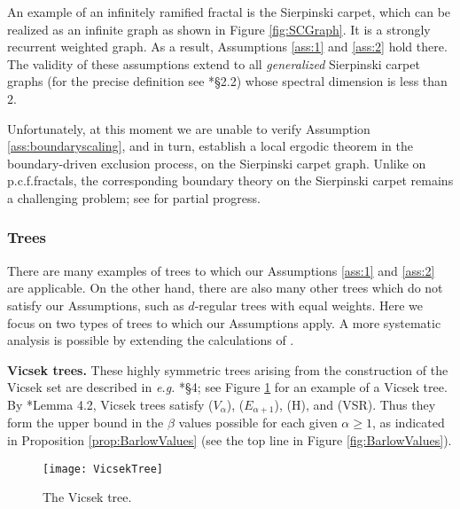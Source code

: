 \documentclass[11pt]{amsart}
\theoremstyle{plain}
\theoremstyle{definition}
\theoremstyle{remark}
\begin{document}
An example of an infinitely ramified fractal is the Sierpinski carpet, which can be realized as an infinite graph as shown in Figure \ref{fig:SCGraph}. It is a strongly recurrent weighted graph. As a result, Assumptions \ref{ass:1} and \ref{ass:2} hold there. The validity of these assumptions extend to all \emph{generalized} Sierpinski carpet graphs (for the precise definition see \cite{BBKT}*{\S2.2}) whose spectral dimension is less than $2$. 

Unfortunately, at this moment we are unable to verify Assumption \ref{ass:boundaryscaling}, and in turn, establish a local ergodic theorem in the boundary-driven exclusion process, on the Sierpinski carpet graph. Unlike on p.c.f.\@ fractals, the corresponding boundary theory on the Sierpinski carpet remains a challenging problem; see \cites{HinoKumagai, BKS13} for partial progress. 

\subsubsection{Trees}

There are many examples of trees to which our Assumptions \ref{ass:1} and \ref{ass:2} are applicable. On the other hand, there are also many other trees which do not satisfy our Assumptions, such as $d$-regular trees with equal weights. Here we focus on two types of trees to which our Assumptions apply. A more systematic analysis is possible by extending the calculations of \cite{Pearce}.

\textbf{Vicsek trees.} These highly symmetric trees arising from the construction of the Vicsek set are described in \emph{e.g.\@} \cite{BarlowValues}*{\S4}; see Figure \ref{fig:Vicsek} for an example of a Vicsek tree. By \cite{BarlowValues}*{Lemma 4.2}, Vicsek trees satisfy ($V_\alpha$), ($E_{\alpha+1}$), (H), and (VSR). Thus they form the upper bound in the $\beta$ values possible for each given $\alpha\geq 1$, as indicated in Proposition \ref{prop:BarlowValues} (see the top line in Figure \ref{fig:BarlowValues}).

\begin{figure}
\centering
\texttt{[image: VicsekTree]}
\caption{The Vicsek tree.}
\label{fig:Vicsek}
\end{figure}
\end{document}
